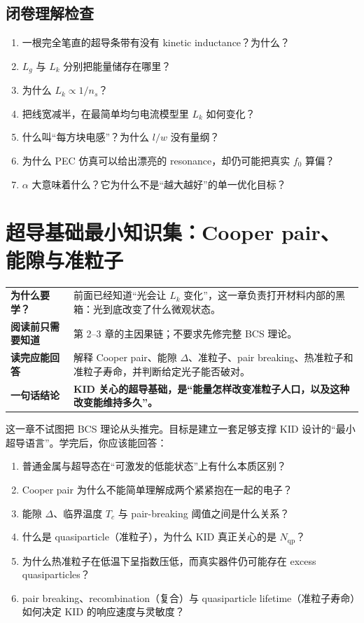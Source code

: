 \documentclass[11pt,a4paper,openany]{ctexrep}
\newcommand{\chapterguide}[4]{%
\begin{tcolorbox}[
  enhanced,
  breakable,
  colback=KidGray!45,
  colframe=KidBlue!65,
  boxrule=0.8pt,
  arc=2mm,
  title=本章导航,
  fonttitle=\bfseries,
  before skip=0.7em,
  after skip=1.0em]
\renewcommand{\arraystretch}{1.18}
\noindent\begin{tabularx}{\textwidth}{>{\bfseries\color{KidBlue}}p{3.0cm} X}
为什么要学？ & #1 \\
阅读前只需要知道 & #2 \\
读完应能回答 & #3 \\
一句话结论 & \textbf{#4} \\
\end{tabularx}
\end{tcolorbox}%
}
\newcommand{\qp}{\mathrm{qp}}
\begin{document}
\section{闭卷理解检查}
\begin{checkpointbox}
\begin{enumerate}
  \item 一根完全笔直的超导条带有没有 kinetic inductance？为什么？
  \item $L_g$ 与 $L_k$ 分别把能量储存在哪里？
  \item 为什么 $L_k\propto1/n_s$？
  \item 把线宽减半，在最简单均匀电流模型里 $L_k$ 如何变化？
  \item 什么叫“每方块电感”？为什么 $l/w$ 没有量纲？
  \item 为什么 PEC 仿真可以给出漂亮的 resonance，却仍可能把真实 $f_0$ 算偏？
  \item $\alpha$ 大意味着什么？它为什么不是“越大越好”的单一优化目标？
\end{enumerate}
\end{checkpointbox}


\chapter{超导基础最小知识集：Cooper pair、能隙与准粒子}
\chapterguide
{前面已经知道“光会让 $L_k$ 变化”，这一章负责打开材料内部的黑箱：光到底改变了什么微观状态。}
{第 2--3 章的主因果链；不要求先修完整 BCS 理论。}
{解释 Cooper pair、能隙 $\Delta$、准粒子、pair breaking、热准粒子和准粒子寿命，并判断给定光子能否破对。}
{KID 关心的超导基础，是“能量怎样改变准粒子人口，以及这种改变能维持多久”。}

\begin{goalbox}
这一章不试图把 BCS 理论从头推完。目标是建立一套足够支撑 KID 设计的“最小超导语言”。学完后，你应该能回答：
\begin{enumerate}
  \item 普通金属与超导态在“可激发的低能状态”上有什么本质区别？
  \item Cooper pair 为什么不能简单理解成两个紧紧抱在一起的电子？
  \item 能隙 $\Delta$、临界温度 $T_c$ 与 pair-breaking 阈值之间是什么关系？
  \item 什么是 quasiparticle（准粒子），为什么 KID 真正关心的是 $N_{\qp}$？
  \item 为什么热准粒子在低温下呈指数压低，而真实器件仍可能存在 excess quasiparticles？
  \item pair breaking、recombination（复合）与 quasiparticle lifetime（准粒子寿命）如何决定 KID 的响应速度与灵敏度？
\end{enumerate}
\end{goalbox}
\end{document}
